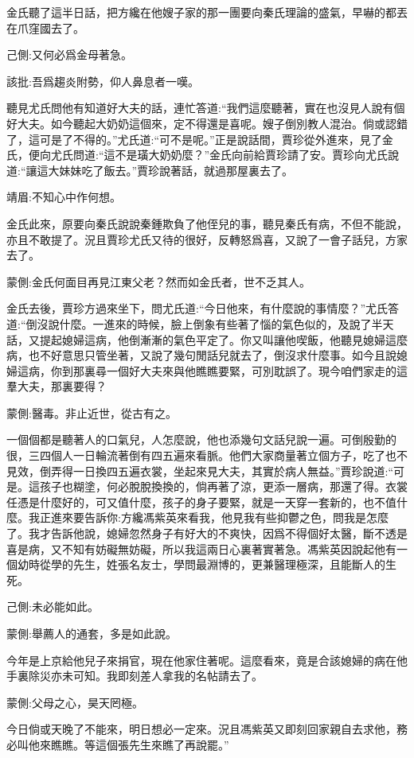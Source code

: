 \begin{parag}
    金氏聽了這半日話，把方纔在他嫂子家的那一團要向秦氏理論的盛氣，早嚇的都丟在爪窪國去了。\begin{note}己側:又何必爲金母著急。\end{note}\begin{note}該批:吾爲趨炎附勢，仰人鼻息者一嘆。\end{note}聽見尤氏問他有知道好大夫的話，連忙答道:“我們這麼聽著，實在也沒見人說有個好大夫。如今聽起大奶奶這個來，定不得還是喜呢。嫂子倒別教人混治。倘或認錯了，這可是了不得的。”尤氏道:“可不是呢。”正是說話間，賈珍從外進來，見了金氏，便向尤氏問道:“這不是璜大奶奶麼？”金氏向前給賈珍請了安。賈珍向尤氏說道:“讓這大妹妹吃了飯去。”賈珍說著話，就過那屋裏去了。\begin{note}靖眉:不知心中作何想。\end{note}金氏此來，原要向秦氏說說秦鍾欺負了他侄兒的事，聽見秦氏有病，不但不能說，亦且不敢提了。況且賈珍尤氏又待的很好，反轉怒爲喜，又說了一會子話兒，方家去了。\begin{note}蒙側:金氏何面目再見江東父老？然而如金氏者，世不乏其人。\end{note}
\end{parag}


\begin{parag}
    金氏去後，賈珍方過來坐下，問尤氏道:“今日他來，有什麼說的事情麼？”尤氏答道:“倒沒說什麼。一進來的時候，臉上倒象有些著了惱的氣色似的，及說了半天話，又提起媳婦這病，他倒漸漸的氣色平定了。你又叫讓他喫飯，他聽見媳婦這麼病，也不好意思只管坐著，又說了幾句閒話兒就去了，倒沒求什麼事。如今且說媳婦這病，你到那裏尋一個好大夫來與他瞧瞧要緊，可別耽誤了。現今咱們家走的這羣大夫，那裏要得？\begin{note}蒙側:醫毒。非止近世，從古有之。\end{note}一個個都是聽著人的口氣兒，人怎麼說，他也添幾句文話兒說一遍。可倒殷勤的很，三四個人一日輪流著倒有四五遍來看脈。他們大家商量著立個方子，吃了也不見效，倒弄得一日換四五遍衣裳，坐起來見大夫，其實於病人無益。”賈珍說道:“可是。這孩子也糊塗，何必脫脫換換的，倘再著了涼，更添一層病，那還了得。衣裳任憑是什麼好的，可又值什麼，孩子的身子要緊，就是一天穿一套新的，也不值什麼。我正進來要告訴你:方纔馮紫英來看我，他見我有些抑鬱之色，問我是怎麼了。我才告訴他說，媳婦忽然身子有好大的不爽快，因爲不得個好太醫，斷不透是喜是病，又不知有妨礙無妨礙，所以我這兩日心裏著實著急。馮紫英因說起他有一個幼時從學的先生，姓張名友士，學問最淵博的，更兼醫理極深，且能斷人的生死。\begin{note}己側:未必能如此。\end{note}\begin{note}蒙側:舉薦人的通套，多是如此說。\end{note}今年是上京給他兒子來捐官，現在他家住著呢。這麼看來，竟是合該媳婦的病在他手裏除災亦未可知。我即刻差人拿我的名帖請去了。\begin{note}蒙側:父母之心，昊天罔極。\end{note}今日倘或天晚了不能來，明日想必一定來。況且馮紫英又即刻回家親自去求他，務必叫他來瞧瞧。等這個張先生來瞧了再說罷。”
\end{parag}


